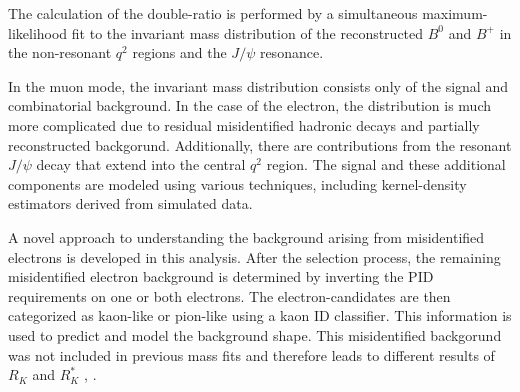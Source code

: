 The calculation of the double-ratio is performed by a simultaneous maximum-likelihood 
fit to the invariant mass distribution of the reconstructed $B^0$ and $B^+$ in the 
non-resonant $q^2$ regions and the $J\!/\!\psi$ resonance. 

In the muon mode, the invariant mass distribution consists only of the signal and 
combinatorial background. 
In the case of the electron, the distribution is much more complicated due to 
residual misidentified hadronic decays and partially reconstructed backgorund. 
Additionally, there are contributions from the resonant $J\!/\!\psi$ decay that extend 
into the central $q^2$ region. 
The signal and these additional components are modeled using various techniques, 
including kernel-density estimators derived from simulated data.

A novel approach to understanding the background arising from misidentified 
electrons is developed in this analysis. After the selection process, the remaining 
misidentified electron background is determined by inverting the PID requirements 
on one or both electrons. The electron-candidates are then categorized as kaon-like or 
pion-like using a kaon ID classifier. This information is used to predict and model 
the background shape.
This misidentified backgorund was not included in previous mass fits and therefore
leads to different results of $R_K$ and $R_K^*$ \cite{previous_RK}, \cite{previous_RK*}.

